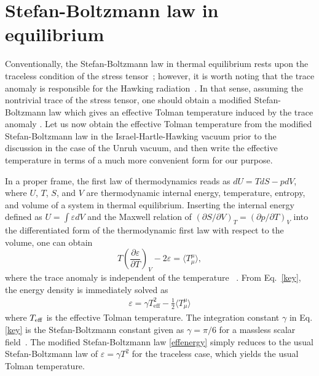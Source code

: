 \documentclass[aps,a4paper,showpacs,showkeys,superscriptaddress,12pt]{revtex4-1}
\begin{document}
\section{Stefan-Boltzmann law in equilibrium}
\label{sec:Stefan-Boltzmann law in equilibrium}

Conventionally, the Stefan-Boltzmann law in thermal equilibrium rests upon
the traceless condition of the stress tensor~\cite{Tolman:1930zza};
however, it is worth noting that the trace anomaly is responsible for the
Hawking radiation~\cite{Christensen:1977jc}.
In that sense, assuming the nontrivial trace of the stress tensor,
one should obtain a modified Stefan-Boltzmann law which gives an effective Tolman temperature
induced by the trace anomaly \cite{Gim:2015era}.
Let us now obtain the effective Tolman temperature from the modified Stefan-Boltzmann law
in the Israel-Hartle-Hawking vacuum prior to the discussion in the case of the Unruh vacuum,
and then write
the effective temperature in terms of a much more convenient form for our purpose.

In a proper frame, the first law of thermodynamics reads as $dU =TdS-pdV$,
where $U$, $T$, $S$, and $V$ are thermodynamic internal energy,
temperature, entropy, and volume of a system in thermal equilibrium.
Inserting the internal energy defined as $U=\int \varepsilon dV$
and the Maxwell relation of
$(\partial S/\partial V )_T = (\partial p/\partial T)_V$
into the differentiated form of the thermodynamic first law with respect to the volume,
one can obtain
\begin{equation}
\label{key}
T \left(\frac{\partial \varepsilon}{\partial T}\right)_V-2\varepsilon = \langle T^\mu_\mu \rangle,
\end{equation}
where the trace anomaly is independent of the temperature
~\cite{BoschiFilho:1991xz}.
From Eq.~\eqref{key}, the energy density is immediately solved as
\begin{align}
 \varepsilon= \gamma T^2_\text{eff} -\frac{1}{2} \langle T^\mu_\mu \rangle  \label{effenergy}
\end{align}
where $T_{\rm eff}$ is the effective Tolman temperature.
The integration constant $\gamma$ in Eq. \eqref{key}
is the Stefan-Boltzmann constant given as $\gamma = \pi/6$
for a massless scalar field~\cite{Christensen:1977jc}.
The modified Stefan-Boltzmann law \eqref{effenergy}
simply reduces to the usual Stefan-Boltzmann law of $\varepsilon=\gamma T^2$
for the traceless case, which yields the usual Tolman temperature.
\end{document}
